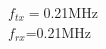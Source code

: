 \documentclass[preview]{standalone}
\begin{document}
\begin{center}
$f_{tx}=$0.21MHz\\$f_{rx}$=0.21MHz
\end{center}
\end{document}
